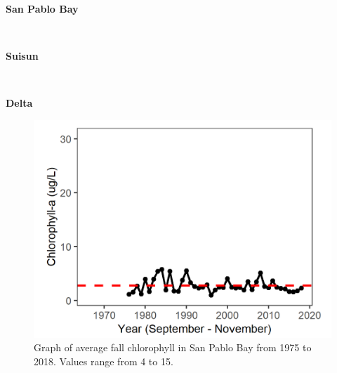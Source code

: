 \documentclass[
]{book}
\begin{document}
\begin{panel-grid}

\begin{columns-nocenter}

\begin{column800}

\textbf{San Pablo Bay}

\end{column800}

\begin{column40}

~

\end{column40}

\begin{column800}

\textbf{Suisun}

\end{column800}

\begin{column40}

~

\end{column40}

\begin{column800}

\textbf{Delta}

\end{column800}

\end{columns-nocenter}

\begin{columns-nocenter}

\begin{column800}

\begin{expand}

\begin{figure}
\includegraphics[width=15.25in]{figures/chla_splfall} \caption{Graph of average fall chlorophyll in San Pablo Bay from 1975 to 2018. Values range from 4 to 15.}\label{fig:unnamed-chunk-108}
\end{figure}


\end{expand}
\end{column800}
\end{columns-nocenter}
\end{panel-grid}
\end{document}
